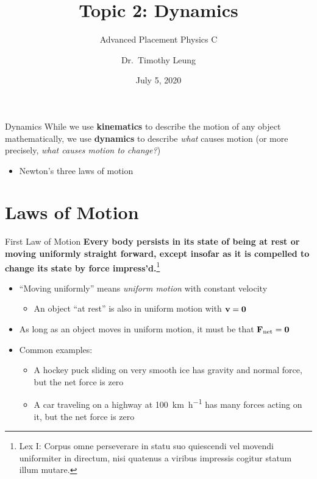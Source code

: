 \documentclass[12pt,compress,aspectratio=169]{beamer}
\title{Topic 2: Dynamics}
\subtitle{Advanced Placement Physics C}
\author[TML]{Dr.\ Timothy Leung}
\institute{Olympiads School}
\date{July 5, 2020}
\newcommand{\mb}[1]{\ensuremath\mathbf{#1}}
\begin{document}
\begin{frame}
  \maketitle
\end{frame}

\begin{frame}{Dynamics}
  While we use \textbf{kinematics} to describe the motion of any object
  mathematically, we use \textbf{dynamics} to describe \emph{what} causes
  motion (or more precisely, \emph{what causes motion to change?})
  \begin{itemize}
  \item Newton's three laws of motion
  \end{itemize}
\end{frame}



\section{Laws of Motion}

\begin{frame}{First Law of Motion}
  \textbf{Every body persists in its state of being at rest or moving uniformly
    straight forward, except insofar as it is compelled to change its state by
    force impress'd.}\footnote{Lex I: Corpus omne perseverare in statu suo
    quiescendi vel movendi uniformiter in directum, nisi quatenus a viribus
    impressis cogitur statum illum mutare.}
  
  \begin{itemize}
  \item ``Moving uniformly'' means \emph{uniform motion} with constant velocity
    \begin{itemize}
    \item An object ``at rest'' is also in uniform motion with $\mb{v}=\mb{0}$
    \end{itemize}
  \item As long as an object moves in uniform motion, it must be that
    $\mb{F}_\mathrm{net}=\mb{0}$
  \item Common examples:
    \begin{itemize}
    \item A hockey puck sliding on very smooth ice has gravity and normal
      force, but the net force is zero
    \item A car traveling on a highway at \SI{100}{\kilo\metre\per\hour}
      has many forces acting on it, but the net force is zero 
    \end{itemize}
  \end{itemize}
  \vspace{.2in}
\end{frame}
\end{document}
